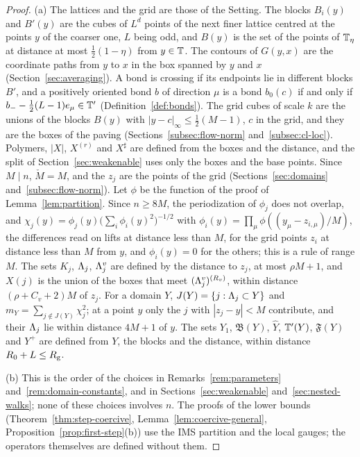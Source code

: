 \begin{proof}
(a) The lattices and the grid are those of the Setting. The blocks $B_i(y)$ and $B'(y)$ are the cubes of $L^d$ points of the next finer lattice centred at the points $y$ of the coarser one, $L$ being odd, and $B(y)$ is the set of the points of $\mathbb T_\eta$ at distance at most $\frac12(1-\eta)$ from $y\in\mathbb T$. The contours of $G(y,x)$ are the coordinate paths from $y$ to $x$ in the box spanned by $y$ and $x$ (Section~\ref{sec:averaging}). A bond is crossing if its endpoints lie in different blocks $B'$, and a positively oriented bond $b$ of direction $\mu$ is a bond $b_0(c)$ if and only if $b_--\frac12(L-1)e_\mu\in\mathbb T'$ (Definition~\ref{def:bonds}). The grid cubes of scale $k$ are the unions of the blocks $B(y)$ with $|y-c|_\infty\le\frac12(M-1)$, $c$ in the grid, and they are the boxes of the paving (Sections~\ref{subsec:flow-norm} and~\ref{subsec:cl-loc}). Polymers, $|X|$, $X^{(r)}$ and $X^\sharp$ are defined from the boxes and the distance, and the split of Section~\ref{sec:weakenable} uses only the boxes and the base points. Since $M\mid n$, $\check M=M$, and the $z_j$ are the points of the grid (Sections~\ref{sec:domains} and~\ref{subsec:flow-norm}). Let $\phi$ be the function of the proof of Lemma~\ref{lem:partition}. Since $n\ge8M$, the periodization of $\phi_j$ does not overlap, and $\chi_j(y)=\phi_j(y)\big(\sum_i\phi_i(y)^2\big)^{-1/2}$ with $\phi_i(y)=\prod_\mu\phi((y_\mu-z_{i,\mu})/M)$, the differences read on lifts at distance less than $M$, for the grid points $z_i$ at distance less than $M$ from $y$, and $\phi_i(y)=0$ for the others; this is a rule of range $M$. The sets $K_j$, $\Lambda_j$, $\Lambda^v_j$ are defined by the distance to $z_j$, at most $\rho M+1$, and $X(j)$ is the union of the boxes that meet $(\Lambda^v_j)^{(R_v)}$, within distance $(\rho+C_v+2)M$ of $z_j$. For a domain $Y$, $J(Y)=\{j:\Lambda_j\subset Y\}$ and $m_Y=\sum_{j\notin J(Y)}\chi_j^2$; at a point $y$ only the $j$ with $|z_j-y|<M$ contribute, and their $\Lambda_j$ lie within distance $4M+1$ of $y$. The sets $Y_1$, $\mathfrak B(Y)$, $\hat Y$, $\mathbb T'(Y)$, $\mathfrak F(Y)$ and $Y^+$ are defined from $Y$, the blocks and the distance, within distance $R_0+L\le R_{\rm g}$.

(b) This is the order of the choices in Remarks~\ref{rem:parameters} and~\ref{rem:domain-constants}, and in Sections~\ref{sec:weakenable} and~\ref{sec:nested-walks}; none of these choices involves $n$. The proofs of the lower bounds (Theorem~\ref{thm:step-coercive}, Lemma~\ref{lem:coercive-general}, Proposition~\ref{prop:first-step}(b)) use the IMS partition and the local gauges; the operators themselves are defined without them.


\end{proof}
